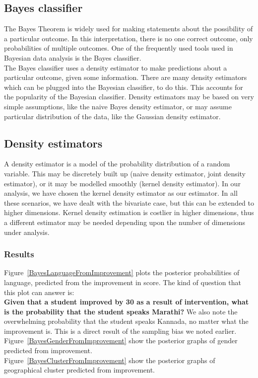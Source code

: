 \documentclass[10pt]{article}
\begin{document}
\subsection{Bayes classifier}
\label{sec:BayesClassifiers}
The Bayes Theorem is widely used for making statements about the possibility of a particular outcome. In this interpretation, there is no one correct outcome, only probabilities of multiple outcomes. One of the frequently used tools used in Bayesian data analysis is the Bayes classifier.\\
The Bayes classifier uses a density estimator to make predictions about a particular outcome, given some information. There are many density estimators which can be plugged into the Bayesian classifier, to do this. This accounts for the popularity of the Bayesian classifier. Density estimators may be based on very simple assumptions, like the naive Bayes density estimator, or may assume particular distribution of the data, like the Gaussian density estimator.\\
\subsection{Density estimators}
A density estimator is a model of the probability distribution of a random variable. This may be discretely built up (naive density estimator, joint density estimator), or it may be modelled smoothly (kernel density estimator). In our analysis, we have chosen the kernel density estimator as our estimator. In all these scenarios, we have dealt with the bivariate case, but this can be extended to higher dimensions. Kernel density estimation is costlier in higher dimensions, thus a different estimator may be needed depending upon the number of dimensions under analysis.
\subsubsection{Results}
Figure~\ref{BayesLanguageFromImprovement} plots the posterior probabilities of language, predicted from the improvement in score. The kind of question that this plot can answer is:\\
\textbf{Given that a student improved by 30 as a result of intervention, what is the probability that the student speaks Marathi?}
We also note the overwhelming probability that the student speaks Kannada, no matter what the improvement is. This is a direct result of the sampling bias we noted earlier.
Figure~\ref{BayesGenderFromImprovement} show the posterior graphs of gender predicted from improvement.\\
Figure~\ref{BayesClusterFromImprovement} show the posterior graphs of geographical cluster predicted from improvement.\\
\end{document}
